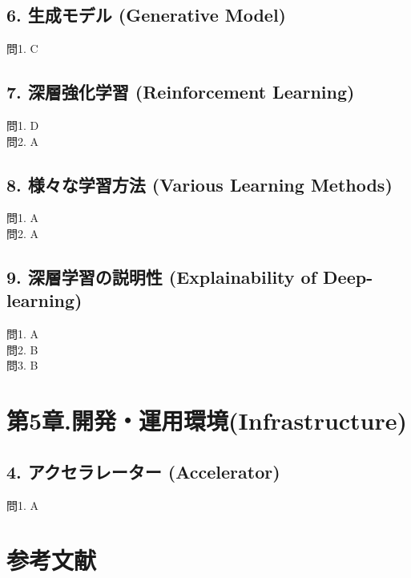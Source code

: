 \documentclass[
  letterpaper,
  DIV=11,
  numbers=noendperiod]{scrreprt}
\begin{document}
\section{6. 生成モデル (Generative
Model)}\label{ux751fux6210ux30e2ux30c7ux30eb-generative-model-1}

問1. C

\section{7. 深層強化学習 (Reinforcement
Learning)}\label{ux6df1ux5c64ux5f37ux5316ux5b66ux7fd2-reinforcement-learning-1}

問1. D\\
問2. A

\section{8. 様々な学習方法 (Various Learning
Methods)}\label{ux69d8ux3005ux306aux5b66ux7fd2ux65b9ux6cd5-various-learning-methods-1}

問1. A\\
問2. A

\section{9. 深層学習の説明性 (Explainability of
Deep-learning)}\label{ux6df1ux5c64ux5b66ux7fd2ux306eux8aacux660eux6027-explainability-of-deep-learning-1}

問1. A\\
問2. B\\
問3. B


\chapter{第5章.開発・運用環境(Infrastructure)}\label{ux7b2c5ux7ae0.ux958bux767aux904bux7528ux74b0ux5883infrastructure-1}

\section{4. アクセラレーター
(Accelerator)}\label{ux30a2ux30afux30bbux30e9ux30ecux30fcux30bfux30fc-accelerator-1}

問1. A


\chapter{参考文献}\label{ux53c2ux8003ux6587ux732e}
\end{document}
